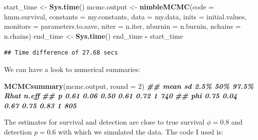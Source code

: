 \documentclass[
  12pt,
]{krantz}
\newenvironment{Shaded}{\begin{snugshade}}{\end{snugshade}}
\newcommand{\AttributeTok}[1]{\textcolor[rgb]{0.13,0.29,0.53}{#1}}
\newcommand{\DecValTok}[1]{\textcolor[rgb]{0.00,0.00,0.81}{#1}}
\newcommand{\DocumentationTok}[1]{\textcolor[rgb]{0.56,0.35,0.01}{\textbf{\textit{#1}}}}
\newcommand{\FunctionTok}[1]{\textcolor[rgb]{0.13,0.29,0.53}{\textbf{#1}}}
\newcommand{\NormalTok}[1]{#1}
\newcommand{\OtherTok}[1]{\textcolor[rgb]{0.56,0.35,0.01}{#1}}
\newcommand{\SpecialCharTok}[1]{\textcolor[rgb]{0.81,0.36,0.00}{\textbf{#1}}}
\begin{document}
\begin{Shaded}
\begin{Highlighting}[]
\NormalTok{start\_time }\OtherTok{\textless{}{-}} \FunctionTok{Sys.time}\NormalTok{()}
\NormalTok{mcmc.output }\OtherTok{\textless{}{-}} \FunctionTok{nimbleMCMC}\NormalTok{(}\AttributeTok{code =}\NormalTok{ hmm.survival,}
                          \AttributeTok{constants =}\NormalTok{ my.constants,}
                          \AttributeTok{data =}\NormalTok{ my.data,}
                          \AttributeTok{inits =}\NormalTok{ initial.values,}
                          \AttributeTok{monitors =}\NormalTok{ parameters.to.save,}
                          \AttributeTok{niter =}\NormalTok{ n.iter,}
                          \AttributeTok{nburnin =}\NormalTok{ n.burnin,}
                          \AttributeTok{nchains =}\NormalTok{ n.chains)}
\NormalTok{end\_time }\OtherTok{\textless{}{-}} \FunctionTok{Sys.time}\NormalTok{()}
\NormalTok{end\_time }\SpecialCharTok{{-}}\NormalTok{ start\_time}
\end{Highlighting}
\end{Shaded}

\begin{verbatim}
## Time difference of 27.68 secs
\end{verbatim}

We can have a look to numerical summaries:

\begin{Shaded}
\begin{Highlighting}[]
\FunctionTok{MCMCsummary}\NormalTok{(mcmc.output, }\AttributeTok{round =} \DecValTok{2}\NormalTok{)}
\DocumentationTok{\#\#     mean   sd 2.5\%  50\% 97.5\% Rhat n.eff}
\DocumentationTok{\#\# p   0.61 0.06 0.50 0.61  0.72    1   740}
\DocumentationTok{\#\# phi 0.75 0.04 0.67 0.75  0.83    1   805}
\end{Highlighting}
\end{Shaded}

The estimates for survival and detection are close to true survival \(\phi = 0.8\) and detection \(p = 0.6\) with which we simulated the data. The code I used is:
\end{document}
